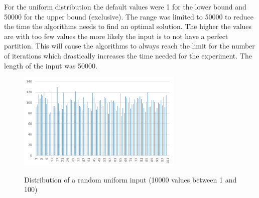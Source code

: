 For the uniform distribution the default values were 1 for the lower bound and 50000 for the upper bound (exclusive).
The range was limited to 50000 to reduce the time the algorithms needs to find an optimal solution.
The higher the values are with too few values the more likely the input is to not have a perfect partition\cite{borgs2001phase}.
This will cause the algorithms to always reach the limit for the number of iterations which drastically increases the time needed for the experiment.
The length of the input was 50000.


\begin{figure}[h]
      \caption{Distribution of a random uniform input (10000 values between 1 and 100)}
      \centering
      \includegraphics[width=0.7\textwidth]{figures/images/numberGenerator/uniformDistributionMin1Max101n10000.png}\label{fig:uniDistExample}
\end{figure}